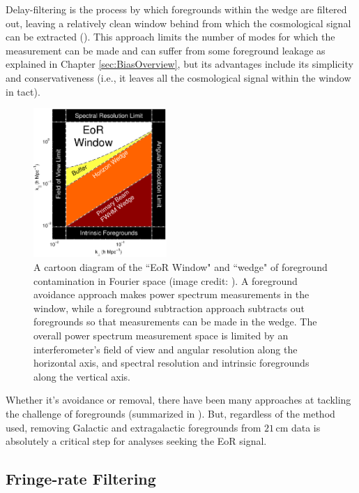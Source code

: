 Delay-filtering is the process by which foregrounds within the wedge are filtered out, leaving a relatively clean window behind from which the cosmological signal can be extracted (\citealt{parsons_et_al2012b}). This approach limits the number of modes for which the measurement can be made and can suffer from some foreground leakage as explained in Chapter \ref{sec:BiasOverview}, but its advantages include its simplicity and conservativeness (i.e., it leaves all the cosmological signal within the window in tact).

\begin{figure}
    \centering
    \includegraphics[width=0.45\textwidth]{plots/wedge.pdf}
    \caption{A cartoon diagram of the ``EoR Window" and ``wedge" of foreground contamination in Fourier space (image credit: \citet{dillon_et_al2015b}). A foreground avoidance approach makes power spectrum measurements in the window, while a foreground subtraction approach subtracts out foregrounds so that measurements can be made in the wedge. The overall power spectrum measurement space is limited by an interferometer's field of view and angular resolution along the horizontal axis, and spectral resolution and intrinsic foregrounds along the vertical axis.}
    \label{fig:wedge}
\end{figure}

Whether it's avoidance or removal, there have been many approaches at tackling the challenge of foregrounds (summarized in \citet{chapman_et_al2016}). But, regardless of the method used, removing Galactic and extragalactic foregrounds from $21$\,cm data is absolutely a critical step for analyses seeking the EoR signal. 

\subsection{Fringe-rate Filtering}

